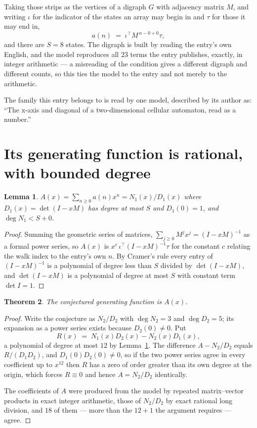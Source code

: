 \documentclass[11pt,a4paper]{article}
\theoremstyle{plain}
\newtheorem{theorem}{Theorem}
\newtheorem{lemma}[theorem]{Lemma}
\theoremstyle{definition}
\begin{document}
Taking those strips as the vertices of a digraph $G$ with adjacency matrix $M$, and writing
$\iota$ for the indicator of the states an array may begin in and $\tau$ for those it may end
in,
\[
a(n)\;=\;\iota^{\!\top}M^{\,n-0+0}\tau ,
\]
and there are $S=8$ states. The digraph is built by reading the entry's own English, and the
model reproduces all $23$ terms the entry publishes, exactly, in integer arithmetic --- a
misreading of the condition gives a different digraph and different counts, so this ties the
model to the entry and not merely to the arithmetic.

The family this entry belongs to is read by one model, described by its author as: ``The x-axis and diagonal of a two-dimensional cellular automaton, read as a number.''


\section{Its generating function is rational, with bounded degree}

\begin{lemma}\label{lem:rat}
$A(x)=\sum_{n\ge0}a(n)x^n=N_1(x)/D_1(x)$ where $D_1(x)=\det(I-xM)$ has degree at most
$S$ and $D_1(0)=1$, and $\deg N_1<S+0$.
\end{lemma}

\begin{proof}
Summing the geometric series of matrices, $\sum_{j\ge0}M^jx^j=(I-xM)^{-1}$ as a formal
power series, so $A(x)$ is $x^{c}\,\iota^{\!\top}(I-xM)^{-1}\tau$ for the constant $c$
relating the walk index to the entry's own $n$. By Cramer's rule every entry of
$(I-xM)^{-1}$ is a polynomial of degree less than $S$ divided by $\det(I-xM)$, and
$\det(I-xM)$ is a polynomial of degree at most $S$ with constant term $\det I=1$.
\end{proof}

\begin{theorem}
The conjectured generating function is $A(x)$.
\end{theorem}

\begin{proof}
Write the conjecture as $N_2/D_2$ with $\deg N_2=3$ and $\deg D_2=5$; its expansion as a
power series exists because $D_2(0)\neq0$. Put
\[
R(x)\;=\;N_1(x)D_2(x)-N_2(x)D_1(x),
\]
a polynomial of degree at most $12$ by Lemma~\ref{lem:rat}. The difference
$A-N_2/D_2$ equals $R/(D_1D_2)$, and $D_1(0)D_2(0)\neq0$, so if the two power series agree in
every coefficient up to $x^{12}$ then $R$ has a zero of order greater than its own
degree at the origin, which forces $R\equiv0$ and hence $A=N_2/D_2$ identically.

The coefficients of $A$ were produced from the model by repeated matrix--vector products in
exact integer arithmetic, those of $N_2/D_2$ by exact rational long division, and $18$
of them --- more than the $12+1$ the argument requires --- agree.
\end{proof}
\end{document}
